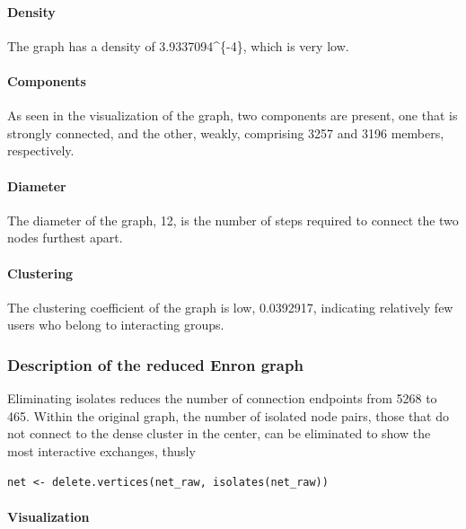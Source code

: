 \documentclass[]{article}
\let\oldparagraph\paragraph
\renewcommand{\paragraph}[1]{\oldparagraph{#1}\mbox{}}
\begin{document}
\hypertarget{density}{%
\paragraph{Density}\label{density}}

The graph has a density of 3.9337094\^{}\{-4\}, which is very
low.

\hypertarget{components}{%
\paragraph{Components}\label{components}}

As seen in the visualization of the graph, two components are present,
one that is strongly connected, and the other, weakly, comprising 3257
and 3196 members, respectively.

\hypertarget{diameter}{%
\paragraph{Diameter}\label{diameter}}

The diameter of the graph, 12, is the number of steps required to
connect the two nodes furthest apart.

\hypertarget{clustering}{%
\paragraph{Clustering}\label{clustering}}

The clustering coefficient of the graph is low, 0.0392917, indicating
relatively few users who belong to interacting groups.

\hypertarget{description-of-the-reduced-enron-graph}{%
\subsubsection{Description of the reduced Enron
graph}\label{description-of-the-reduced-enron-graph}}

Eliminating isolates reduces the number of connection endpoints from
5268 to 465. Within the original graph, the number of isolated node
pairs, those that do not connect to the dense cluster in the center, can
be eliminated to show the most interactive exchanges, thusly

\begin{verbatim}
net <- delete.vertices(net_raw, isolates(net_raw))
\end{verbatim}

\hypertarget{visualization-1}{%
\paragraph{Visualization}\label{visualization-1}}
\end{document}
